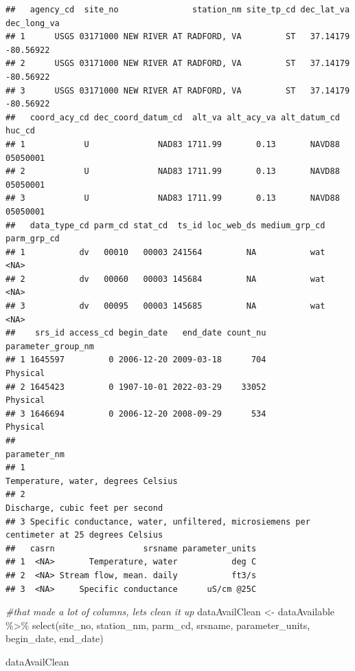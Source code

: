 \documentclass[
]{book}
\newenvironment{Shaded}{\begin{snugshade}}{\end{snugshade}}
\newcommand{\CommentTok}[1]{\textcolor[rgb]{0.56,0.35,0.01}{\textit{#1}}}
\newcommand{\FunctionTok}[1]{\textcolor[rgb]{0.00,0.00,0.00}{#1}}
\newcommand{\NormalTok}[1]{#1}
\newcommand{\OtherTok}[1]{\textcolor[rgb]{0.56,0.35,0.01}{#1}}
\newcommand{\SpecialCharTok}[1]{\textcolor[rgb]{0.00,0.00,0.00}{#1}}
\begin{document}
\begin{verbatim}
##   agency_cd  site_no               station_nm site_tp_cd dec_lat_va dec_long_va
## 1      USGS 03171000 NEW RIVER AT RADFORD, VA         ST   37.14179   -80.56922
## 2      USGS 03171000 NEW RIVER AT RADFORD, VA         ST   37.14179   -80.56922
## 3      USGS 03171000 NEW RIVER AT RADFORD, VA         ST   37.14179   -80.56922
##   coord_acy_cd dec_coord_datum_cd  alt_va alt_acy_va alt_datum_cd   huc_cd
## 1            U              NAD83 1711.99       0.13       NAVD88 05050001
## 2            U              NAD83 1711.99       0.13       NAVD88 05050001
## 3            U              NAD83 1711.99       0.13       NAVD88 05050001
##   data_type_cd parm_cd stat_cd  ts_id loc_web_ds medium_grp_cd parm_grp_cd
## 1           dv   00010   00003 241564         NA           wat        <NA>
## 2           dv   00060   00003 145684         NA           wat        <NA>
## 3           dv   00095   00003 145685         NA           wat        <NA>
##    srs_id access_cd begin_date   end_date count_nu parameter_group_nm
## 1 1645597         0 2006-12-20 2009-03-18      704           Physical
## 2 1645423         0 1907-10-01 2022-03-29    33052           Physical
## 3 1646694         0 2006-12-20 2008-09-29      534           Physical
##                                                                                 parameter_nm
## 1                                                        Temperature, water, degrees Celsius
## 2                                                           Discharge, cubic feet per second
## 3 Specific conductance, water, unfiltered, microsiemens per centimeter at 25 degrees Celsius
##   casrn                  srsname parameter_units
## 1  <NA>       Temperature, water           deg C
## 2  <NA> Stream flow, mean. daily           ft3/s
## 3  <NA>     Specific conductance      uS/cm @25C
\end{verbatim}

\begin{Shaded}
\begin{Highlighting}[]
\CommentTok{\#that made a lot of columns, let\textquotesingle{}s clean it up}
\NormalTok{dataAvailClean }\OtherTok{\textless{}{-}}\NormalTok{ dataAvailable }\SpecialCharTok{\%\textgreater{}\%} \FunctionTok{select}\NormalTok{(site\_no, }
\NormalTok{                                           station\_nm,}
\NormalTok{                                           parm\_cd, }
\NormalTok{                                           srsname, }
\NormalTok{                                           parameter\_units,}
\NormalTok{                                           begin\_date, }
\NormalTok{                                           end\_date)}

\NormalTok{dataAvailClean}
\end{Highlighting}
\end{Shaded}
\end{document}
